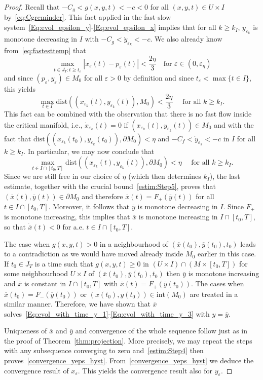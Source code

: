\documentclass[12pt]{article}
\newcommand{\benn}{\begin{equation*}}
\newcommand{\eenn}{\end{equation*}}
\begin{document}
\begin{proof}
Recall that $-C_g<g(x,y,t)<-c<0$ for all $(x,y,t)\in U\times I$ by~\eqref{eq:Cgreminder}. 
This fact applied in the fast-slow system~\eqref{Eq:evol_epsilon_y}-\eqref{Eq:evol_epsilon_x} 
implies that for all $k\geq k_I$, $y_{\varepsilon_k}$ is monotone decreasing in $I$ 
with $-C_g < \dot{y}_{\varepsilon_k} < -c$. We also already know from~\eqref{eq:fastesttemp}
that
\benn
\max_{t\in \overline{J_T}: t \geq t_\varepsilon} |x_\varepsilon(t) - p_\varepsilon(t)| 
<\frac{2\eta}{3}\quad \text{for $\varepsilon\in (0,\varepsilon_\eta)$} 
\eenn
and since $(p_\varepsilon,y_\varepsilon)\in M_0$ for all $\varepsilon >0$ by 
definition and since $t_\varepsilon < \max\{ t \in I \}$, this yields 
\benn
\max_{t\in I}\mathrm{dist}((x_{\varepsilon_k}(t),y_{\varepsilon_k}(t)), M_0)
<\frac{2\eta}{3}\quad \text{ for all $k\geq k_I$}. 
\eenn		
This fact can be combined with the observation that there is no fast 
flow inside the critical manifold, i.e., $\dot{x}_{\varepsilon_k}(t)=0$ 
if $(x_{\varepsilon_k}(t),y_{\varepsilon_k}(t))\in M_0$ and with the fact that 
$\mathrm{dist}((x_{\varepsilon_k}(t_0),y_{\varepsilon_k}(t_0)), \partial M_0)<\eta$ 
and $-C_f < \dot{y}_{\varepsilon_k} < -c$ in $I$ for all $k\geq k_I$. In particular,
we may now conclude that
\benn
\max_{t\in I\cap [t_0,T]}\mathrm{dist}((x_{\varepsilon_k}(t),y_{\varepsilon_k}(t)), 
\partial M_0)<\eta\quad \text{ for all $k\geq k_I$}.
\eenn
Since we are still free in our choice of $\eta$ (which then determines $k_I$), 
the last estimate, together with the crucial bound~\eqref{estim:Step5}, proves 
that $(\overline{x}(t),\overline{y}(t))\in \partial M_0$ and therefore 
$\overline{x}(t)=F_+(\overline{y}(t))$ for all $t\in I\cap [t_0,T]$. Moreover, 
it follows that $\overline{y}$ is monotone decreasing in $I$. Since $F_+$ is 
monotone increasing, this implies that $\overline{x}$ is monotone increasing 
in $I \cap [t_0,T]$, so that 
$\dot{\overline{x}}(t)<0$ for a.e. $t\in I\cap [t_0,T]$.
		
The case when $g(x,y,t)>0$ in a neighbourhood of $(\overline{x}(t_0),\overline{y}(t_0),t_0)$ 
leads to a contradiction as we would have moved already inside $M_0$ earlier in
this case. If $t_0\in J_T$ is a time such that $g(x,y,t)\geq 0$ in $(U\times I )\cap 
(M\times [t_0,T])$ for some neighbourhood $U\times I$ of $(\overline{x}(t_0),
\overline{y}(t_0),t_0)$ then $\overline{y}$ is monotone increasing and $\overline{x}$ 
is constant in $I \cap [t_0,T]$ with $\overline{x}(t)=F_+(\overline{y}(t_0))$.
The cases when $\overline{x}(t_0)=F_-(\overline{y}(t_0))$ or $(x(t_0),y(t_0))\in 
\mathrm{int}(M_0)$ are treated in a similar manner.
Therefore, we have shown that $\overline{x}$ 
solves~\eqref{Eq:evol_with_time_y_1}-\eqref{Eq:evol_with_time_y_3} with $y=\overline{y}$.
	
Uniqueness of	$\overline{x}$ and $\overline{y}$ and convergence of the whole sequence 
follow just as in the proof of Theorem~\ref{thm:projection}. More precisely, we may repeat the
steps with any subsequence converging to zero and~\eqref{estim:Step4} then proves~\eqref{convergence_yeps_hyst}.
From~\eqref{convergence_yeps_hyst} we deduce the convergence result of $x_\varepsilon$. 
This yields the convergence result also for $y_\varepsilon$.
\end{proof}
\end{document}
